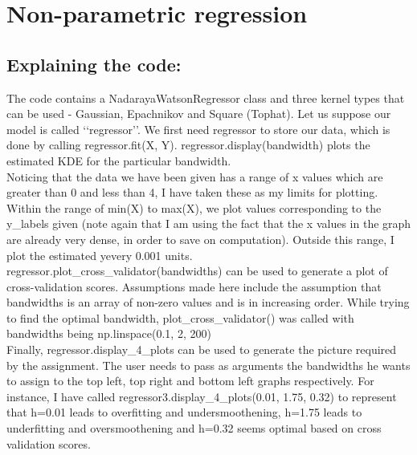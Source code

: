 \section{Non-parametric regression}

\subsection{Explaining the code:}
 The code contains a NadarayaWatsonRegressor class and three kernel types that can be used - Gaussian, Epachnikov and Square (Tophat). Let us suppose our model is called \lq\lq regressor\rq\rq. We first need regressor to store our data, which is done by calling regressor.fit(X, Y). regressor.display(bandwidth) plots the estimated KDE for the particular bandwidth.\\
 Noticing that the data we have been given has a range of x values which are greater than 0 and less than 4, I have taken these as my limits for plotting.\\
 Within the range of min(X) to max(X), we plot values corresponding to the y\_labels given (note again that I am using the fact that the x values in the graph are already very dense, in order to save on computation). Outside this range, I plot the estimated y\value every 0.001 units.\\
 regressor.plot\_cross\_validator(bandwidths) can be used to generate a plot of cross-validation scores. Assumptions made here include the assumption that bandwidths is an array of non-zero values and is in increasing order. While trying to find the optimal bandwidth, plot\_cross\_validator() was called with bandwidths being np.linspace(0.1, 2, 200)\\
 Finally, regressor.display\_4\_plots can be used to generate the picture required by the assignment. The user needs to pass as arguments the bandwidths he wants to assign to the top left, top right and bottom left graphs respectively. For instance, I have called regressor3.display\_4\_plots(0.01, 1.75, 0.32) to represent that h=0.01 leads to overfitting and undersmoothening, h=1.75 leads to underfitting and oversmoothening and h=0.32 seems optimal based on cross validation scores.

